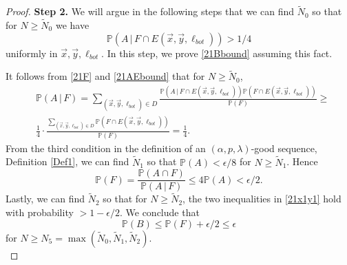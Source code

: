 \begin{proof}
		\noindent\textbf{Step 2.} We will argue in the following steps that we can find $\tilde{N}_0$ so that for $N\geq \tilde{N}_0$ we have
		\begin{equation}\label{21AEbound}
		\mathbb{P}(A\,|\, F\cap E(\vec{x},\vec{y},\ell_{bot})) > 1/4
		\end{equation}
		uniformly in $\vec{x},\vec{y},\ell_{bot}$. In this step, we prove \eqref{21Bbound} assuming this fact. 
		
		It follows from \eqref{21F} and \eqref{21AEbound} that for $N\geq\tilde{N}_0$,
		\begin{align*}
		&\mathbb{P}(A\,|\,F) = \sum_{(\vec{x},\vec{y},\ell_{bot})\in D} \frac{\mathbb{P}(A\,|\,F\cap E(\vec{x},\vec{y},\ell_{bot}))\mathbb{P}(F\cap E(\vec{x},\vec{y},\ell_{bot}))}{\mathbb{P}(F)} \geq \\ &\frac{1}{4}\cdot\frac{\sum_{(\vec{x},\vec{y},\ell_{bot})\in D} \mathbb{P}(F\cap E(\vec{x},\vec{y},\ell_{bot}))}{\mathbb{P}(F)} = \frac{1}{4}.
		\end{align*}
		From the third condition in the definition of an $(\alpha,p,\lambda)$-good sequence, Definition \ref{Def1}, we can find $\tilde{N}_1$ so that $\mathbb{P}(A) < \epsilon/8$ for $N\geq\tilde{N}_1$. Hence
		\[
		\mathbb{P}(F) = \frac{\mathbb{P}(A\cap F)}{\mathbb{P}(A\,|\,F)} \leq 4\mathbb{P}(A) < \epsilon/2.
		\]
		Lastly, we can find $\tilde{N}_2$ so that for $N\geq\tilde{N}_2$, the two inequalities in \eqref{21x1y1} hold with probability $>1-\epsilon/2$. We conclude that
		\[
		\mathbb{P}(B) \leq \mathbb{P}(F) + \epsilon/2 \leq \epsilon
		\]
		for $N\geq N_5 = \max(\tilde{N}_0,\tilde{N}_1,\tilde{N}_2)$.\\
		

\end{proof}
